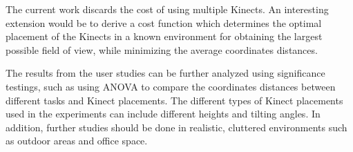 The current work discards the cost of using multiple Kinects. An interesting extension would be to derive a cost function which determines the optimal placement of the Kinects in a known environment for obtaining the largest possible field of view, while minimizing the average coordinates distances.

The results from the user studies can be further analyzed using significance testings, such as using ANOVA to compare the coordinates distances between different tasks and Kinect placements. The different types of Kinect placements used in the experiments can include different heights and tilting angles. In addition, further studies should be done in realistic, cluttered environments such as outdoor areas and office space.


